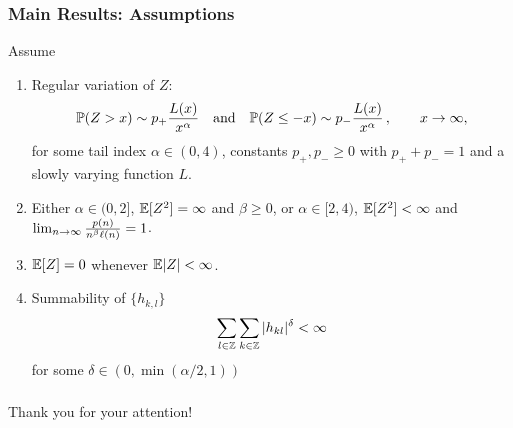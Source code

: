 \documentclass{beamer}
\begin{document}
\begin{frame}
  \frametitle{Main Results: Assumptions}
  Assume
  \begin{scriptsize}
    \begin{enumerate}
    \item Regular variation of $Z$:
      \begin{equation*}
        \P(Z>x)\sim p_+ \dfrac{L(x)}{x^{\alpha}}\quad\mbox{and}\quad  \P(Z\le -x)\sim p_-
        \dfrac{L(x)}{x^{\alpha}}\,,\qquad x \to \infty,
      \end{equation*}
      for some tail index $\alpha \in (0, 4)$, constants $p_+,p_-\ge 0$ with
      $p_++p_-=1$ and a slowly varying function $L$.
    \item Either $\alpha \in (0,2]$, $\E[Z^2]=\infty$ and $\beta \ge 0$,
      or $\alpha \in [2,4)$, $\E[Z^2]<\infty$ and
      $\lim_{n \to \infty} {p(n) \over n^\beta \ell(n)} = 1$.
    \item $\E[Z]=0$ whenever $\E |Z| <\infty$.
    \item Summability of $\{h_{k,l}\}$
      \begin{equation*}
        \sum_{l \in \integers} \sum_{k\in \integers} |h_{kl}|^{\delta} <\infty
      \end{equation*}
      for some $\delta\in (0,\min({\alpha/2},1))$
    \end{enumerate}
  \end{scriptsize}
\end{frame}

\begin{frame}
  \frametitle{ }
  \begin{centering}
    \Large Thank you for your attention!
  \end{centering}
 \end{frame}



\end{document}
